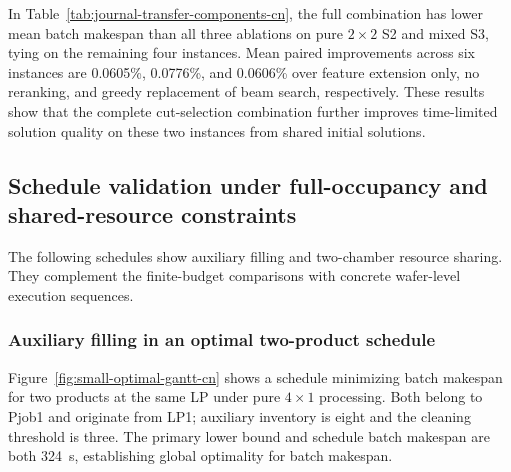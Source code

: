 \documentclass[final,5p,times,twocolumn]{elsarticle}
\begin{document}
\begin{table}[!htbp]
\centering\small
\caption{Components with shared SPBS inputs (mean batch makespan, s)}
\label{tab:journal-transfer-components-cn}
\end{table}


In Table~\ref{tab:journal-transfer-components-cn}, the full combination has lower mean batch makespan than all three ablations on pure $2\times2$ S2 and mixed S3, tying on the remaining four instances. Mean paired improvements across six instances are 0.0605\%, 0.0776\%, and 0.0606\% over feature extension only, no reranking, and greedy replacement of beam search, respectively. These results show that the complete cut-selection combination further improves time-limited solution quality on these two instances from shared initial solutions.

\subsection{Schedule validation under full-occupancy and shared-resource constraints}
\label{sec:coverage-scale-cn}
The following schedules show auxiliary filling and two-chamber resource sharing. They complement the finite-budget comparisons with concrete wafer-level execution sequences.

\subsubsection{Auxiliary filling in an optimal two-product schedule}
Figure~\ref{fig:small-optimal-gantt-cn} shows a schedule minimizing batch makespan for two products at the same LP under pure $4\times1$ processing. Both belong to Pjob1 and originate from LP1; auxiliary inventory is eight and the cleaning threshold is three. The primary lower bound and schedule batch makespan are both 324~s, establishing global optimality for batch makespan.
\end{document}
